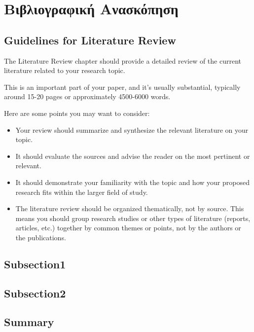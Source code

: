 \chapter{Βιβλιογραφική Ανασκόπηση}

\section*{Guidelines for Literature Review}
The Literature Review chapter should provide a detailed review of the current literature related to your research topic. 

This is an important part of your paper, and it's usually substantial, typically around 15-20 pages or approximately 4500-6000 words. 

Here are some points you may want to consider:
\begin{itemize}
    \item Your review should summarize and synthesize the relevant literature on your topic.
    \item It should evaluate the sources and advise the reader on the most pertinent or relevant.
    \item It should demonstrate your familiarity with the topic and how your proposed research fits within the larger field of study.
    \item The literature review should be organized thematically, not by source. This means you should group research studies or other types of literature (reports, articles, etc.) together by common themes or points, not by the authors or the publications.
\end{itemize}

\section{Subsection1}

\section{Subsection2}


\section{Summary}
